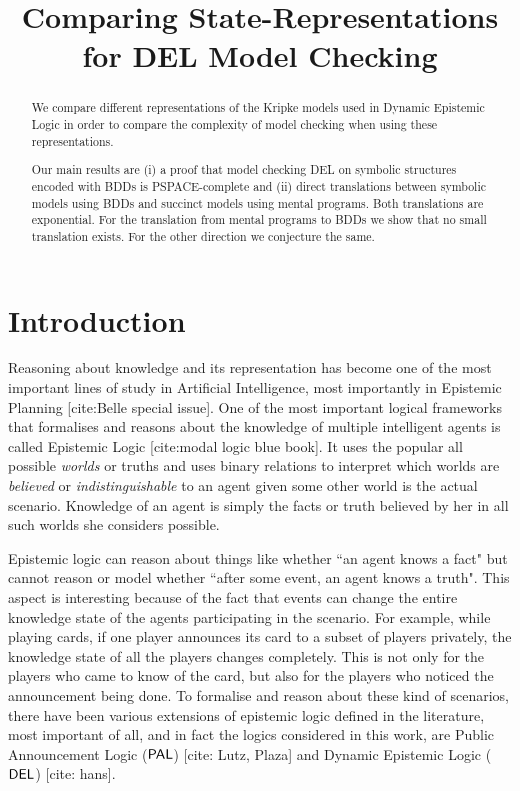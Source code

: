 \documentclass[submission,copyright,creativecommons]{eptcs}
\title{Comparing State-Representations for DEL Model Checking}
\author{
}
\begin{document}
\maketitle

\begin{abstract}
  We compare different representations of the Kripke models used in Dynamic Epistemic Logic in order to compare the complexity of model checking when using these representations.

  Our main results are
  (i) a proof that model checking DEL on symbolic structures encoded with BDDs is PSPACE-complete and
  (ii) direct translations between symbolic models using BDDs and succinct models using mental programs.
  Both translations are exponential.
  For the translation from mental programs to BDDs we show that no small translation exists.
  For the other direction we conjecture the same.
\end{abstract}

\section{Introduction}

Reasoning about knowledge and its representation has become one of the most important lines of study in Artificial Intelligence, most importantly in Epistemic Planning [cite:Belle special issue]. One of the most important logical frameworks that formalises and reasons about the knowledge of multiple intelligent agents is called Epistemic Logic [cite:modal logic blue book]. It uses the popular all possible \emph{worlds} or truths and uses binary relations to interpret which worlds are \emph{believed} or \emph{indistinguishable} to an agent given some other world is the actual scenario. Knowledge of an agent is simply the facts or truth believed by her in all such worlds she considers possible.

Epistemic logic can reason about things like whether ``an agent knows a fact" but cannot reason or model whether ``after some event, an agent knows a truth". This aspect is interesting because of the fact that events can change the entire knowledge state of the agents participating in the scenario. For example, while playing cards, if one player announces its card to a subset of players privately, the knowledge state of all the players changes completely. This is not only for the players who came to know of the card, but also for the players who noticed the announcement being done. To formalise and reason about these kind of scenarios, there have been various extensions of epistemic logic defined in the literature, most important of all, and in fact the logics considered in this work, are  Public Announcement Logic ($\mathsf{PAL}$) [cite: Lutz, Plaza] and Dynamic Epistemic Logic ($\mathsf{DEL}$) [cite: hans]. 
\end{document}
